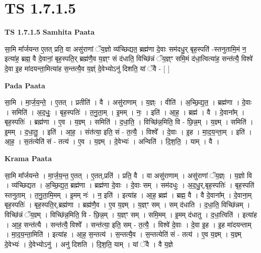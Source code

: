 \documentclass[17pt]{extarticle}
\begin{document}
\section*{ TS 1.7.1.5 }

\textbf{TS 1.7.1.5 } \newline
\textbf{Samhita Paata} \newline

सा॒मि मा᳚र्जयन्त ए॒तत् प्रति॒ वा असु॑राणां ॅय॒ज्ञो व्य॑च्छिद्यत॒ ब्रह्म॑णा दे॒वाः सम॑दधु॒र् बृह॒स्पति॑ -स्तनुतामि॒मं न॒ इत्या॑ह॒ ब्रह्म॒ वै दे॒वानां॒ बृह॒स्पति॒र् ब्रह्म॑णै॒व य॒ज्ञ्ꣳ सं द॑धाति॒ विच्छि॑न्नं ॅय॒ज्ञ्ꣳ समि॒मं द॑धा॒त्वित्या॑ह॒ सन्त॑त्यै॒ विश्वे॑ दे॒वा इ॒ह मा॑दयन्ता॒मित्या॑ह स॒न्तत्यै॒व य॒ज्ञ्ं दे॒वेभ्योऽनु॑ दिशति॒ यां ॅवै - [ ] \newline

\textbf{Pada Paata} \newline

सा॒मि । मा॒र्ज॒य॒न्ते॒ । ए॒तत् । प्रतीति॑ । वै । असु॑राणाम् । य॒ज्ञ्ः । वीति॑ । अ॒च्छि॒द्य॒त॒ । ब्रह्म॑णा । दे॒वाः । समिति॑ । अ॒द॒धुः॒ । बृह॒स्पतिः॑ । त॒नु॒ता॒म् । इ॒मम् । नः॒ । इति॑ । आ॒ह॒ । ब्रह्म॑ । वै । दे॒वाना᳚म् । बृह॒स्पतिः॑ । ब्रह्म॑णा । ए॒व । य॒ज्ञ्म् । समिति॑ । द॒धा॒ति॒ । विच्छि॑न्न॒मिति॒ वि - छि॒न्न॒म् । य॒ज्ञ्म् । समिति॑ । इ॒मम् । द॒धा॒तु॒ । इति॑ । आ॒ह॒ । संत॑त्या॒ इति॒ सं - त॒त्यै॒ । विश्वे᳚ । दे॒वाः । इ॒ह । मा॒द॒य॒न्ता॒म् । इति॑ । आ॒ह॒ । स॒तंत्येति॑ सं - तत्य॑ । ए॒व । य॒ज्ञ्म् । दे॒वेभ्यः॑ । अन्विति॑ । दि॒श॒ति॒ । याम् । वै ।  \newline


\textbf{Krama Paata} \newline

सा॒मि मा᳚र्जयन्ते । मा॒र्ज॒य॒न्त॒ ए॒तत् । ए॒तत्,प्रति॑ । प्रति॒ वै । वा असु॑राणाम् । असु॑राणां ॅय॒ज्ञ्ः । य॒ज्ञो वि । व्य॑च्छिद्यत । अ॒च्छि॒द्य॒त॒ ब्रह्म॑णा । ब्रह्म॑णा दे॒वाः । दे॒वाः सम् । सम॑दधुः । अ॒द॒धु॒र्,बृह॒स्पतिः॑ । बृह॒स्पति॑ स्तनुताम् । त॒नु॒ता॒मि॒मम् । इ॒मम् नः॑ । न॒ इति॑ । इत्या॑ह । आ॒ह॒ ब्रह्म॑ । ब्रह्म॒ वै । वै दे॒वाना᳚म् । दे॒वाना॒म् बृह॒स्पतिः॑ । बृह॒स्पति॒र्,ब्रह्म॑णा । ब्रह्म॑णै॒व । ए॒व य॒ज्ञ्म् । य॒ज्ञ्ꣳ सम् । सम् द॑धाति । द॒धा॒ति॒ विच्छि॑न्नम् । विच्छि॑न्नं ॅय॒ज्ञ्म् । विच्छि॑न्न॒मिति॒ वि - छि॒न्न॒म् । य॒ज्ञ्ꣳ सम् । समि॒मम् । इ॒मम् द॑धातु । द॒धा॒त्विति॑ । इत्या॑ह । आ॒ह॒ सन्त॑त्यै । सन्त॑त्यै॒ विश्वे᳚ । सन्त॑त्या॒ इति॒ सम् - त॒त्यै॒ । विश्वे॑ दे॒वाः । दे॒वा इ॒ह । इ॒ह मा॑दयन्ताम् । मा॒द॒य॒न्ता॒मिति॑ । इत्या॑ह । आ॒ह॒ स॒न्तत्य॑ । स॒न्तत्यै॒व । स॒न्तत्येति॑ सं - तत्य॑ । ए॒व य॒ज्ञ्म् । य॒ज्ञ्म् दे॒वेभ्यः॑ । दे॒वेभ्योऽनु॑ । अनु॑ दिशति । दि॒श॒ति॒ याम् । यां ॅवै । वै य॒ज्ञे \newline
\end{document}
